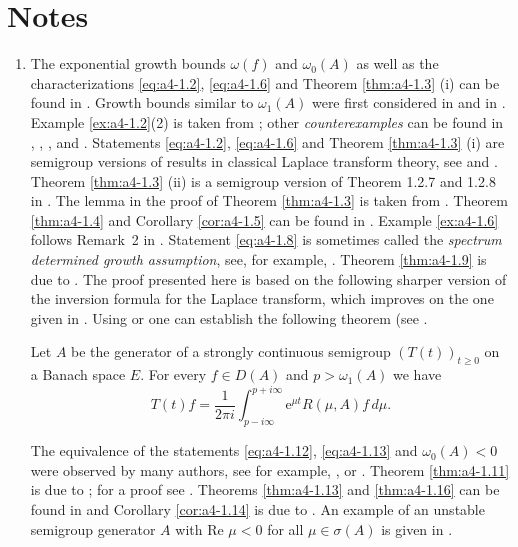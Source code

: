 \section*{Notes}
\begin{enumerate}[label=\emph{Section \arabic*:}, wide, itemsep=1ex]

\item 
The exponential growth bounds $\omega(f)$ and $\omega_{0}(A)$ as well as the characterizations \eqref{eq:a4-1.2}, \eqref{eq:a4-1.6} and Theorem \ref{thm:a4-1.3} (i) can be found in \citet{hillephillips:1957}.
Growth bounds similar to $\omega_{1}(A)$ were first considered in \citet{djacenko:1976} and in \citet[Proposition~2]{zabczyk:1979}. 
Example \ref{ex:a4-1.2}(2) is taken from \citet{wolff:1981}; other \emph{counterexamples} can be found in \citet{hillephillips:1957}, \citet{foias:1973}, \citet{triggiani:1975a}, 
\citet{zabczyk:1975} and \citet{greineretal:1981}. 
Statements \eqref{eq:a4-1.2}, \eqref{eq:a4-1.6} and Theorem \ref{thm:a4-1.3} (i) are semigroup versions of results in classical Laplace transform theory, see \citet{hillephillips:1957} and \citet{widder:1946}. 
Theorem \ref{thm:a4-1.3} (ii) is a semigroup version of Theorem 1.2.7 and 1.2.8 in \citet{doetsch:1950}. 
The lemma in the proof of Theorem \ref{thm:a4-1.3} is taken from \citet{milstein:1975}. 
Theorem \ref{thm:a4-1.4} and Corollary \ref{cor:a4-1.5} can be found in \citet{neubrander:1985a}. 
Example \ref{ex:a4-1.6} follows Remark~2 in \citet{zabczyk:1975}. 
Statement \eqref{eq:a4-1.8} is sometimes called the \emph{spectrum determined growth assumption}, see, for example, \citet{triggiani:1975b}. 
Theorem \ref{thm:a4-1.9} is due to \citet{slemrod:1976}. 
The proof presented here is based on the following sharper version of the inversion formula for the Laplace transform, which improves on the one given in \citet[p.349]{hillephillips:1957}. 
Using \citet[p.66]{widder:1946} or \citet[p.212]{doetsch:1950} one can establish the following theorem (see \citet{neubrander:1984b}.

\begin{theorem}\label{thm:a4-2.6}
Let $A$ be the generator of a strongly continuous semigroup $(T(t))_{t \geq 0}$ on a Banach space $E$. 
For every $f \in D(A)$ and $p > \omega_{1}(A)$ we have
\[
T(t)f = \frac{1}{2\pi i} \int_{p-i\infty}^{p+i\infty} \mathrm{e}^{\mu t}R(\mu,A)f \, d\mu.
\]
\end{theorem}
 

The equivalence of the statements \eqref{eq:a4-1.12}, \eqref{eq:a4-1.13} and \emph{$\omega_{0}(A) < 0$} were observed by many authors, see for example, \citet[p.178]{balakrishnan:1976}, 
or \citet{benchimol:1978b}. 
Theorem \ref{thm:a4-1.11} is due to \citet{datko:1970};
for a proof see \citet[p.116]{pazy:1983}. 
Theorems \ref{thm:a4-1.13} and \ref{thm:a4-1.16} can be found in \citet{neubrander:1985b} and Corollary \ref{cor:a4-1.14} is due to \citet{komatsu:1969}. 
An example of an unstable semigroup generator $A$ with Re $\mu < 0$ for all $\mu \in \sigma(A)$ is given in \citet{datko:1983}.


\end{enumerate}
